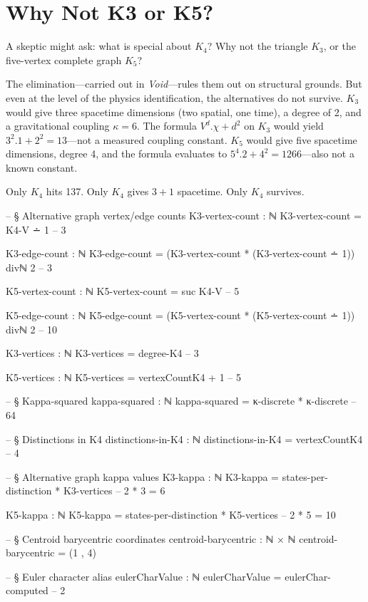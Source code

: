\documentclass[11pt,a4paper]{book}
\def\cdot{.}%
\def\texorpdfstring#1#2{#2}%
\begin{document}
\section{Why Not K\texorpdfstring{$_3$}{3} or K\texorpdfstring{$_5$}{5}?}

A skeptic might ask: what is special about $K_4$? Why not the triangle $K_3$, or the five-vertex complete graph $K_5$?

The elimination---carried out in \textit{Void}---rules them out on structural grounds. But even at the level of the physics identification, the alternatives do not survive. $K_3$ would give three spacetime dimensions (two spatial, one time), a degree of 2, and a gravitational coupling $\kappa = 6$. The formula $V^d \cdot \chi + d^2$ on $K_3$ would yield $3^2 \cdot 1 + 2^2 = 13$---not a measured coupling constant. $K_5$ would give five spacetime dimensions, degree 4, and the formula evaluates to $5^4 \cdot 2 + 4^2 = 1266$---also not a known constant.

Only $K_4$ hits 137. Only $K_4$ gives $3 + 1$ spacetime. Only $K_4$ survives.%

\begin{code}
-- § Alternative graph vertex/edge counts
K3-vertex-count : ℕ
K3-vertex-count = K4-V ∸ 1   -- 3

K3-edge-count : ℕ
K3-edge-count = (K3-vertex-count * (K3-vertex-count ∸ 1)) divℕ 2  -- 3

K5-vertex-count : ℕ
K5-vertex-count = suc K4-V   -- 5

K5-edge-count : ℕ
K5-edge-count = (K5-vertex-count * (K5-vertex-count ∸ 1)) divℕ 2  -- 10

K3-vertices : ℕ
K3-vertices = degree-K4   -- 3

K5-vertices : ℕ
K5-vertices = vertexCountK4 + 1  -- 5

-- § Kappa-squared
kappa-squared : ℕ
kappa-squared = κ-discrete * κ-discrete  -- 64

-- § Distinctions in K4
distinctions-in-K4 : ℕ
distinctions-in-K4 = vertexCountK4  -- 4

-- § Alternative graph kappa values
K3-kappa : ℕ
K3-kappa = states-per-distinction * K3-vertices  -- 2 * 3 = 6

K5-kappa : ℕ
K5-kappa = states-per-distinction * K5-vertices  -- 2 * 5 = 10

-- § Centroid barycentric coordinates
centroid-barycentric : ℕ × ℕ
centroid-barycentric = (1 , 4)

-- § Euler character alias
eulerCharValue : ℕ
eulerCharValue = eulerChar-computed  -- 2
\end{code}
\end{document}
